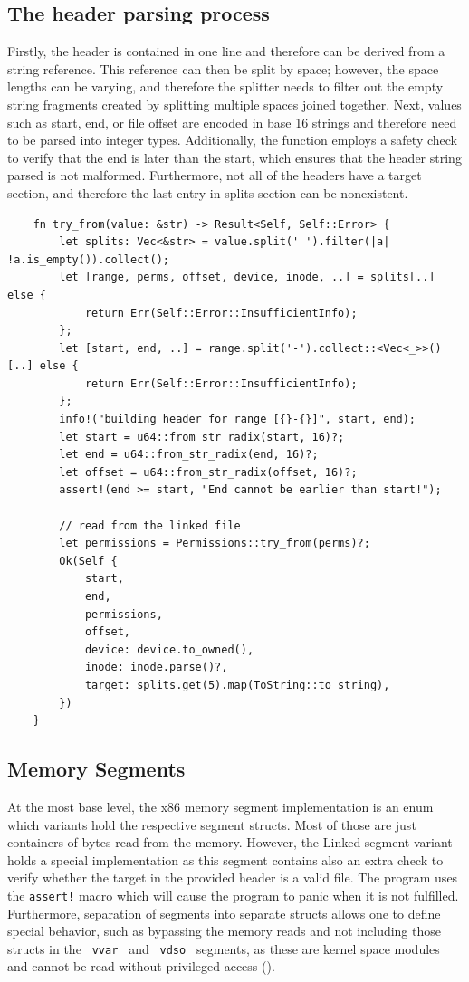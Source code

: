 \subsection{The header parsing process}

Firstly, the header is contained in one line and therefore can be derived from a string reference. This reference can then be split by space; however, the space lengths can be varying, and therefore the splitter needs to filter out the empty string fragments created by splitting multiple spaces joined together.
Next, values such as start, end, or file offset are encoded in base 16 strings and therefore need to be parsed into integer types. 
Additionally, the function employs a safety check to verify that the end is later than the start, which ensures that the header string parsed is not malformed. 
Furthermore, not all of the headers have a target section, and therefore the last entry in splits section can be nonexistent.

\begin{lstlisting}
    fn try_from(value: &str) -> Result<Self, Self::Error> {
        let splits: Vec<&str> = value.split(' ').filter(|a| !a.is_empty()).collect();
        let [range, perms, offset, device, inode, ..] = splits[..] else {
            return Err(Self::Error::InsufficientInfo);
        };
        let [start, end, ..] = range.split('-').collect::<Vec<_>>()[..] else {
            return Err(Self::Error::InsufficientInfo);
        };
        info!("building header for range [{}-{}]", start, end);
        let start = u64::from_str_radix(start, 16)?;
        let end = u64::from_str_radix(end, 16)?;
        let offset = u64::from_str_radix(offset, 16)?;
        assert!(end >= start, "End cannot be earlier than start!");

        // read from the linked file
        let permissions = Permissions::try_from(perms)?;
        Ok(Self {
            start,
            end,
            permissions,
            offset,
            device: device.to_owned(),
            inode: inode.parse()?,
            target: splits.get(5).map(ToString::to_string),
        })
    }
\end{lstlisting}

\subsection{Memory Segments}
\label{reader:segment}

At the most base level, the x86 memory segment implementation is an enum which variants hold the respective segment structs. Most of those are just containers of bytes read from the memory.
However, the Linked segment variant holds a special implementation as this segment contains also an extra check to verify whether the target in the provided header is a valid file. 
The program uses the \verb|assert!| macro which will cause the program to panic when it is not fulfilled.
Furthermore, separation of segments into separate structs allows one to define special behavior, such as bypassing the memory reads and not including those structs in the \verb| vvar | and \verb| vdso | segments, as these are kernel space modules and cannot be read without privileged access (\cite{kerrisk_vdso7_2024}).

